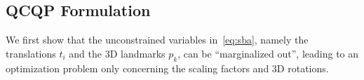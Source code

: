 


\subsection{QCQP Formulation}
\label{sec:qcqp}

We first show that the unconstrained variables in~\eqref{eq:sba}, namely the translations $t_i$ and the 3D landmarks $p_k$, can be ``marginalized out'', leading to an optimization problem only concerning the scaling factors and 3D rotations.

